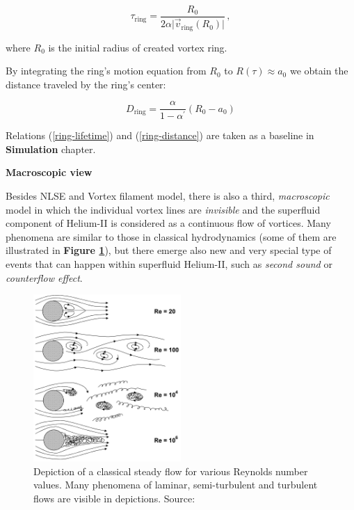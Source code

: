 \begin{equation}
\tau_{\text{ring}} = \frac{R_0}{2 \alpha \vert \vec{v}_{\text{ring}}(R_0)\vert}\,,
\label{ring-lifetime}
\end{equation}

where $R_0$ is the initial radius of created vortex ring.

By integrating the ring's motion equation from $R_0$ to $R(\tau) \approx a_0$ we obtain the distance traveled by the ring's center:

\begin{equation}
D_{\text{ring}} = \frac{\alpha}{1 - \alpha^{\prime}} (R_0 - a_0)
\label{ring-distance}
\end{equation}

Relations (\ref{ring-lifetime}) and (\ref{ring-distance}) are taken as a baseline in \textbf{Simulation} chapter.
\newpage


{\Huge \bfseries Macroscopic view}
\vspace{0.3cm}

Besides NLSE and Vortex filament model, there is also a third, \textit{macroscopic} model in which the individual vortex lines are \textit{invisible} and the superfluid component of Helium-II is considered as a continuous flow of vortices. Many phenomena are similar to those in classical hydrodynamics (some of them are illustrated in \textbf{Figure \ref{laminar-turbulent}}), but there emerge also new and very special type of events that can happen within superfluid Helium-II, such as \textit{second sound} or \textit{counterflow effect}.

\begin{figure}[h]
	\centering
	\includegraphics[width=0.5\textwidth]{graphics/theory/laminar-turbulent}
	\caption{Depiction of a classical steady flow for various Reynolds number values. Many phenomena of laminar, semi-turbulent and turbulent flows are visible in depictions. Source:\cite{laminar-turbulence}}
	\label{laminar-turbulent}
\end{figure}

